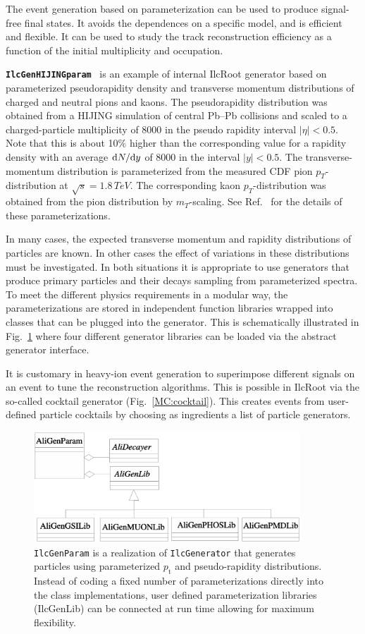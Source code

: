 \documentclass[12pt,a4paper,twoside]{article}
\newcommand{\class}[1]{\texttt{\textbf{#1}}\xspace}
\newcommand{\pt}{\ensuremath{p_{\mathrm{t}}}}
\begin{document}
The event generation based on parameterization can be used to produce
signal-free final states. It avoids the dependences on a
specific model, and is efficient and flexible. It can be used to
study the track reconstruction efficiency
as a function of the initial multiplicity and occupation. 

\class{IlcGenHIJINGparam}~\cite{MC:HIJINGparam} is an example of internal
IlcRoot generator based on parameterized
pseudorapidity density and transverse momentum distributions of
charged and neutral pions and kaons. The pseudorapidity
distribution was obtained from a HIJING simulation of central
Pb--Pb collisions and scaled to a charged-particle multiplicity of
8000 in the pseudo rapidity interval $|\eta | < 0.5$. Note that
this is about 10\% higher than the corresponding value for a
rapidity density with an average ${\rm d}N/{\rm d}y$ of 8000 in
the interval $|y | < 0.5$.
The transverse-momentum distribution is parameterized from the
measured CDF pion $p_T$-distribution at $\sqrt{s} = 1.8 \, TeV$.
The corresponding kaon $p_T$-distribution was obtained from the
pion distribution by $m_T$-scaling. See Ref.~\cite{MC:HIJINGparam}
for the details of these parameterizations.

In many cases, the expected transverse momentum and rapidity
distributions of particles are known. In other cases the effect of
variations in these distributions must be investigated. In both
situations it is appropriate to use generators that produce
primary particles and their decays sampling from parameterized
spectra. To meet the different physics requirements in a modular
way, the parameterizations are stored in independent function
libraries wrapped into classes that can be plugged into the
generator. This is schematically illustrated in
Fig.~\ref{MC:evglib} where four different generator libraries can
be loaded via the abstract generator interface.

It is customary in heavy-ion event generation to superimpose
different signals on an event to tune the reconstruction
algorithms. This is possible in IlcRoot via the so-called cocktail
generator (Fig.~\ref{MC:cocktail}).  This creates events from
user-defined particle cocktails by choosing as ingredients a list
of particle generators.

\begin{figure}[ht]
  \centering
  \includegraphics[width=10cm]{picts/evglib}
  \caption{\texttt{IlcGenParam} is a realization of \texttt{IlcGenerator}
    that generates particles using parameterized $\pt$ and
    pseudo-rapidity distributions. Instead of coding a fixed number of
    parameterizations directly into the class implementations, user
    defined parameterization libraries (IlcGenLib) can be connected at
    run time allowing for maximum flexibility.} \label{MC:evglib}
\end{figure}
\end{document}
